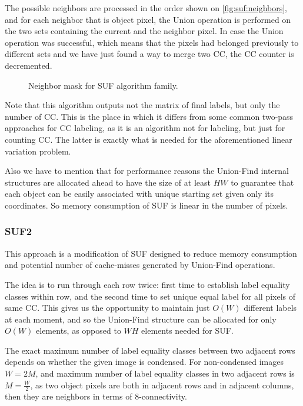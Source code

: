 \documentclass{llncs}
\begin{document}
The possible neighbors are processed in the order shown on \autoref{fig:suf:neighbors},
and for each neighbor that is object pixel, the Union operation is performed
on the two sets containing the current and the neighbor pixel.
In case the Union operation was successful, which means that the pixels
had belonged previously to different sets and we have just found a way to merge two
CC, the CC counter is decremented.

\begin{figure}
  \centering
  \caption{Neighbor mask for SUF algorithm family.}
  \label{fig:suf:neighbors}
\end{figure}

Note that this algorithm outputs not the matrix of final labels, but only the number
of CC.
This is the place in which it differs from some common two-pass approaches for CC %
labeling, as it is an algorithm not for labeling, but just for counting CC.
The latter is exactly what is needed for the aforementioned linear variation problem.

Also we have to mention that for performance reasons the Union-Find internal structures
are allocated ahead to have the size of at least $HW$ to guarantee that
each object can be easily associated with unique starting set given only its
coordinates. So memory consumption of SUF is linear in the number of pixels.

\subsubsection{SUF2}

This approach is a modification of SUF designed to reduce memory consumption
and potential number of cache-misses generated by Union-Find operations.

The idea is to run through each row twice: first time to establish label equality
classes within row, and the second time to set unique equal label for all pixels of
same CC.
This gives us the opportunity to maintain just $O(W)$
different labels at each moment, and so the Union-Find structure can be allocated
for only $O(W)$ elements, as opposed to $WH$ elements needed for SUF.

The exact maximum number of label equality classes between two adjacent rows
depends on whether the given image is condensed.
For non-condensed images $W=2M$, and maximum number of label equality classes
in two adjacent rows is $M=\frac{W}2$, as two object pixels are both in adjacent
rows and in adjacent columns, then they are neighbors in terms of 8-connectivity.
\end{document}
